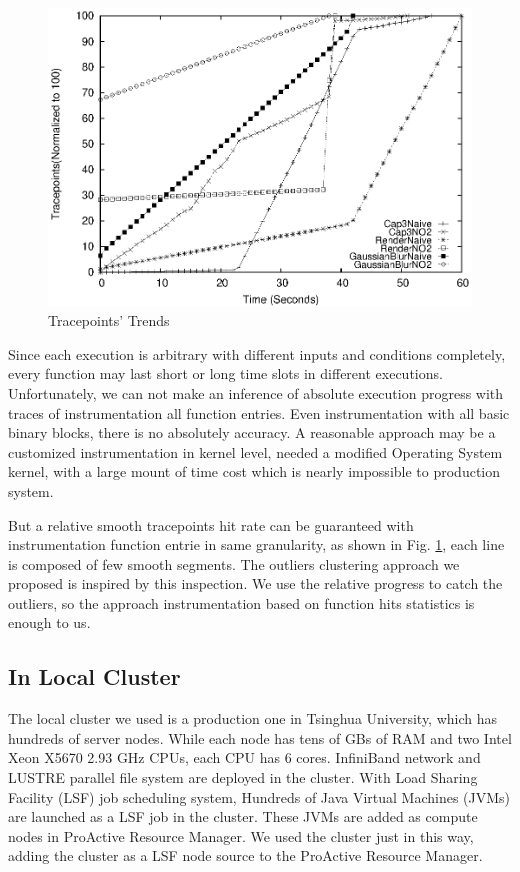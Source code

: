 \begin{figure}
\centering
\includegraphics[width=0.9\columnwidth]{figures/tracepoints_all_vs_sampling.eps}
\caption{Tracepoints' Trends}
\label{figure:tracepoints}
\end{figure}

Since each execution is arbitrary with different inputs and conditions completely, every function may last short or long time slots in different executions. Unfortunately, we can not make an inference of absolute execution progress with traces of instrumentation all function entries. Even instrumentation with all basic binary blocks, there is no absolutely accuracy. A reasonable approach may be a customized instrumentation in kernel level, needed a modified Operating System kernel, with a large mount of time cost which is nearly impossible to production system.

But a relative smooth tracepoints hit rate can be guaranteed with instrumentation function entrie in same granularity, as shown in Fig. \ref{figure:tracepoints}, each line is composed of few smooth segments. The outliers clustering approach we proposed is inspired by this inspection. We use the relative progress to catch the outliers, so the approach instrumentation based on function hits statistics is enough to us.

\subsection{In Local Cluster}

The local cluster we used is a production one in Tsinghua University, which has hundreds of  server nodes. While each node has tens of GBs of RAM and two Intel Xeon X5670 2.93 GHz CPUs, each CPU has 6 cores. InfiniBand network and LUSTRE parallel file system are deployed in the cluster. With Load Sharing Facility (LSF) job scheduling system, Hundreds of Java Virtual Machines (JVMs) are launched as a LSF job in the cluster. These JVMs are added as compute nodes in ProActive Resource Manager. We used the cluster just in this way, adding the cluster as a LSF node source to the ProActive Resource Manager.


